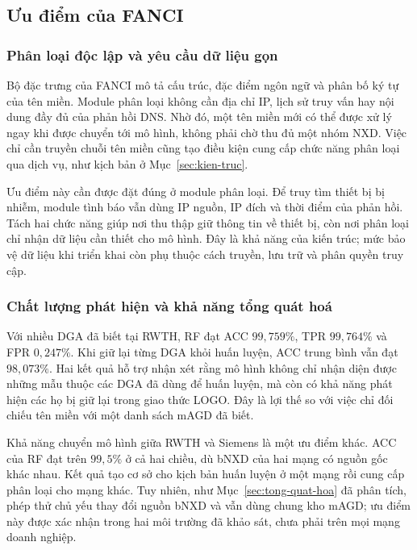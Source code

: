 \subsection{Ưu điểm của FANCI}\label{sec:uu-diem}

\subsubsection{Phân loại độc lập và yêu cầu dữ liệu gọn}

Bộ đặc trưng của FANCI mô tả cấu trúc, đặc điểm ngôn ngữ và phân bố ký tự của tên miền. Module phân loại không cần địa chỉ IP, lịch sử truy vấn hay nội dung đầy đủ của phản hồi DNS. Nhờ đó, một tên miền mới có thể được xử lý ngay khi được chuyển tới mô hình, không phải chờ thu đủ một nhóm NXD. Việc chỉ cần truyền chuỗi tên miền cũng tạo điều kiện cung cấp chức năng phân loại qua dịch vụ, như kịch bản ở Mục~\ref{sec:kien-truc}.

Ưu điểm này cần được đặt đúng ở module phân loại. Để truy tìm thiết bị bị nhiễm, module tình báo vẫn dùng IP nguồn, IP đích và thời điểm của phản hồi. Tách hai chức năng giúp nơi thu thập giữ thông tin về thiết bị, còn nơi phân loại chỉ nhận dữ liệu cần thiết cho mô hình. Đây là khả năng của kiến trúc; mức bảo vệ dữ liệu khi triển khai còn phụ thuộc cách truyền, lưu trữ và phân quyền truy cập.

\subsubsection{Chất lượng phát hiện và khả năng tổng quát hoá}

Với nhiều DGA đã biết tại RWTH, RF đạt ACC $99{,}759\%$, TPR $99{,}764\%$ và FPR $0{,}247\%$. Khi giữ lại từng DGA khỏi huấn luyện, ACC trung bình vẫn đạt $98{,}073\%$. Hai kết quả hỗ trợ nhận xét rằng mô hình không chỉ nhận diện được những mẫu thuộc các DGA đã dùng để huấn luyện, mà còn có khả năng phát hiện các họ bị giữ lại trong giao thức LOGO. Đây là lợi thế so với việc chỉ đối chiếu tên miền với một danh sách mAGD đã biết.

Khả năng chuyển mô hình giữa RWTH và Siemens là một ưu điểm khác. ACC của RF đạt trên $99{,}5\%$ ở cả hai chiều, dù bNXD của hai mạng có nguồn gốc khác nhau. Kết quả tạo cơ sở cho kịch bản huấn luyện ở một mạng rồi cung cấp phân loại cho mạng khác. Tuy nhiên, như Mục~\ref{sec:tong-quat-hoa} đã phân tích, phép thử chủ yếu thay đổi nguồn bNXD và vẫn dùng chung kho mAGD; ưu điểm này được xác nhận trong hai môi trường đã khảo sát, chưa phải trên mọi mạng doanh nghiệp.

